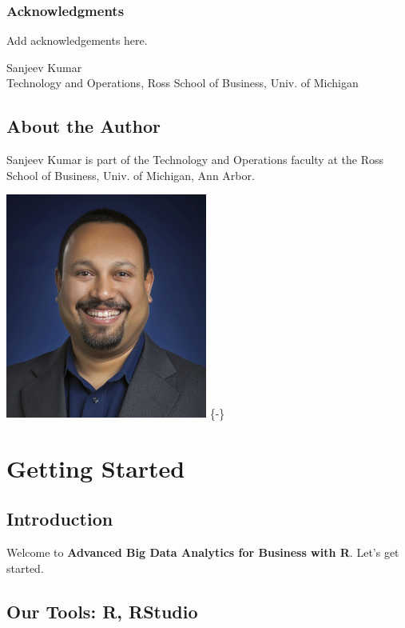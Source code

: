 \documentclass[]{krantz}
\let\BeginKnitrBlock\begin \let\EndKnitrBlock\end
\begin{document}
\section*{Acknowledgments}\label{acknowledgments}


Add acknowledgements here.

\BeginKnitrBlock{flushright}
Sanjeev Kumar\\
Technology and Operations, Ross School of Business, Univ. of Michigan
\EndKnitrBlock{flushright}

\chapter*{About the Author}\label{about-the-author}


Sanjeev Kumar is part of the Technology and Operations faculty at the
Ross School of Business, Univ. of Michigan, Ann Arbor.

\includegraphics[width=2.60417in]{images/SanjeevKumar.jpg} \{-\}

\mainmatter

\part{Getting Started}\label{part-getting-started}

\chapter{Introduction}\label{introduction}

Welcome to \textbf{Advanced Big Data Analytics for Business with R}.
Let's get started.

\chapter{Our Tools: R, RStudio}\label{our-tools-r-rstudio}
\end{document}
